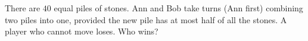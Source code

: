 There are $40$ equal piles of stones. Ann and Bob take turns (Ann first) combining two piles into one, provided the new pile has at most half of all the stones. A player who cannot move loses. Who wins?
